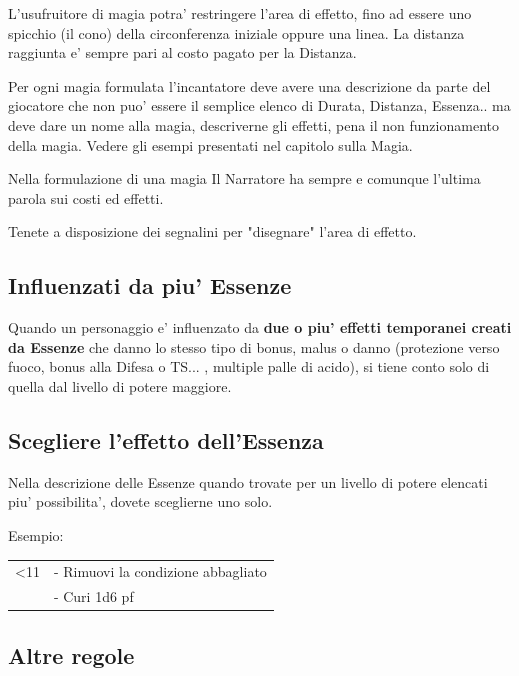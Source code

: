 \documentclass[a4paper,11pt,twoside,openany]{book}
\begin{document}
L'usufruitore di magia potra' restringere l'area di effetto, fino ad essere uno spicchio (il cono) della circonferenza iniziale oppure una linea. La distanza raggiunta e' sempre pari al costo pagato per la Distanza.

Per ogni magia formulata l'incantatore deve avere una descrizione da parte del giocatore che non puo' essere il semplice elenco di Durata, Distanza, Essenza.. ma deve dare un nome alla magia, descriverne gli effetti, pena il non funzionamento della magia. Vedere gli esempi presentati nel capitolo sulla Magia.

Nella formulazione di una magia Il Narratore ha sempre e comunque l'ultima parola sui costi ed effetti.

Tenete a disposizione dei segnalini per "disegnare" l'area di effetto.

\subsection{Influenzati da piu' Essenze}

\label{influenzati-da-piu-essenze}

Quando un personaggio e' influenzato da \textbf{due o piu' effetti temporanei creati da Essenze} che danno lo stesso tipo di bonus, malus o danno (protezione verso fuoco, bonus alla Difesa o TS... , multiple palle di acido), si tiene conto solo di quella dal livello di potere maggiore.

\subsection{Scegliere l'effetto dell'Essenza}

\label{scegliere-leffetto-dellessenza}

Nella descrizione delle Essenze quando trovate per un livello di potere elencati piu' possibilita', dovete sceglierne uno solo.

Esempio:

\medskip

\begin{tabular}{L{3cm} L{13cm}}
\toprule
<11 & - Rimuovi la condizione abbagliato\tabularnewline
& - Curi 1d6 pf
\end{tabular}

\subsection{Altre regole}
\end{document}
